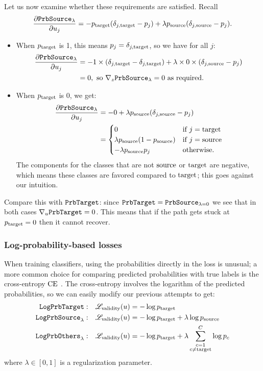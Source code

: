 \documentclass[../main.tex]{subfiles}
\begin{document}
Let us now examine whether these requirements are satisfied. Recall
\begin{align*}
    \frac{\partial \mathtt{PrbSource}_{\lambda}}{\partial u_j}
    = - p_{\mathrm{target}} (\delta_{j, \mathrm{target}} - p_j) + \lambda p_{\mathrm{source}} (\delta_{j, \mathrm{source}} - p_j).
\end{align*}
\begin{itemize}
    \item When $p_{\mathrm{target}}$ is 1, this means $p_j = \delta_{j, \mathrm{target}}$, so we have for all $j$:
         \begin{align*}
              \frac{\partial \mathtt{PrbSource}_{\lambda}}{\partial u_j}
              &= -1 \times (\delta_{j, \mathrm{target}} -\delta_{j, \mathrm{target}}) + \lambda \times 0 \times (\delta_{j, \mathrm{source}} - p_j) \\
              &= 0,\text{ so }  \nabla_{z} \mathtt{PrbSource}_{\lambda} = 0 \text{ as required.}
         \end{align*}
    \item When $p_{\mathrm{target}}$ is 0, we get:
         \begin{align*}
              \frac{\partial \mathtt{PrbSource}_{\lambda}}{\partial u_j}
               & = -0 + \lambda p_{\mathrm{source}} (\delta_{j, \mathrm{source}} - p_j)                        \\
               & = \begin{cases}
                    0                                 & \text{if } j = \mathrm{target} \\
                    \lambda p_{\mathrm{source}} (1 - p_{\mathrm{source}}) & \text{if } j = \mathrm{source} \\
                    - \lambda p_{\mathrm{source}} p_j           & \text{otherwise.}
               \end{cases}
         \end{align*}
         The components for the classes that are not $\mathrm{source}$ or $\mathrm{target}$ are negative, which means these classes are favored compared to $\mathrm{target}$;
         this goes against our intuition.
\end{itemize}

Compare this with $\mathtt{PrbTarget}$: since $\mathtt{PrbTarget} = \mathtt{PrbSource}_{\lambda=0}$ we see that in both cases $\nabla_{u} \mathtt{PrbTarget} = 0$.
This means that if the path gets stuck at $p_{\mathrm{target}} = 0$ then it cannot recover.

\subsubsection{Log-probability-based losses}

When training classifiers, using the probabilities directly in the loss is unusual; a more common choice
for comparing predicted probabilities with true labels is the cross-entropy $\text{CE}$ \cite{murphyMachine2012}.
The cross-entropy involves the logarithm of the predicted probabilities, so we can easily modify our previous attempts to get:
\begin{align*}
    \mathtt{LogPrbTarget}{}:        & \quad    \mathscr{L}_\text{validity}(u) = - \log p_{\mathrm{target}}                              \\
    \mathtt{LogPrbSource}_{\lambda}: & \quad    \mathscr{L}_\text{validity}(u) = - \log p_{\mathrm{target}} + \lambda \log p_{\mathrm{source}}    \\
    \mathtt{LogPrbOthers}_{\lambda}: & \quad    \mathscr{L}_\text{validity}(u) = - \log p_{\mathrm{target}} + \lambda \sum_{\substack{{c}=1 \\ {c} \neq \mathrm{target}}}^C \log p_c
\end{align*}
where $\lambda \in [0, 1]$ is a regularization parameter.
\end{document}
